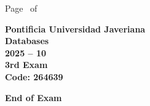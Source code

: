 \documentclass[11pt, addpoints]{exam}\usepackage[utf8]{inputenc}
\begin{document}
\begin{coverpages}
\begin{center}
			\vspace{3mm}
			\leavevmode \hspace{5mm} 
		\end{center}
	\end{coverpages}

	\footer{} {Page \thepage\ of \numpages} {}

	\centering
	\textbf{\Large Pontificia Universidad Javeriana}\\
	\textbf{\Large Databases} \\
	\textbf{\large 2025 -- 10} \\
	\textbf{\large 3rd Exam} \\
	\textbf{Code: 264639}


	\begin{questions}
		
		
		
		
		
		
		
		
		
		
		
		
		
		
		
		
		
		
		
		
	\end{questions}

	\vspace{5mm}
	\noindent \textbf{End of Exam}
\end{document}
